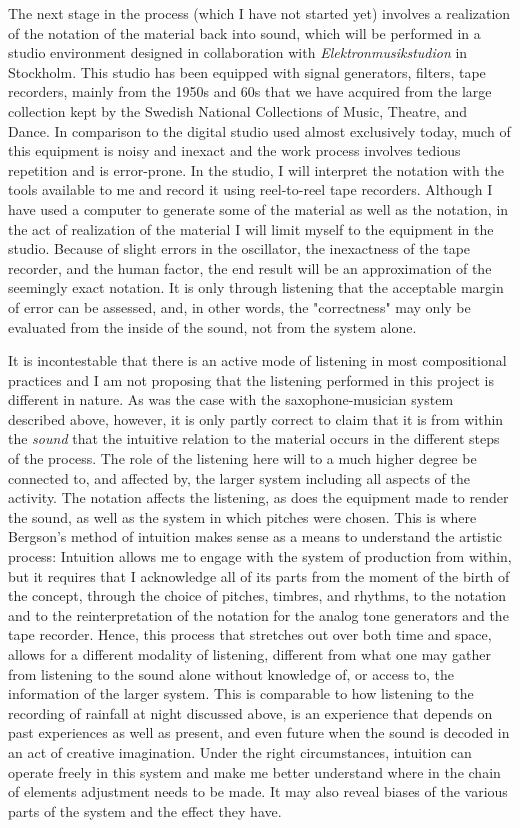 \documentclass[11pt]{article}
\begin{document}
The next stage in the process (which I have not started yet) involves a realization of the notation of the material back into sound, which will be performed in a studio environment designed in collaboration with \emph{Elektronmusikstudion} in Stockholm.
This studio has been equipped with signal generators, filters, tape recorders, mainly from the 1950s and 60s that we have acquired from the large collection kept by the Swedish National Collections of Music, Theatre, and Dance.
In comparison to the digital studio used almost exclusively today, much of this equipment is noisy and inexact and the work process involves tedious repetition and is error-prone.
In the studio, I will interpret the notation with the tools available to me and record it using reel-to-reel tape recorders.
Although I have used a computer to generate some of the material as well as the notation, in the act of realization of the material I will limit myself to the equipment in the studio. 
Because of slight errors in the oscillator, the inexactness of the tape recorder, and the human factor, the end result will be an approximation of the seemingly exact notation.
It is only through listening that the acceptable margin of error can be assessed, and, in other words, the "correctness" may only be evaluated from the inside of the sound, not from the system alone.


It is incontestable that there is an active mode of listening in most compositional practices and I am not proposing that the listening performed in this project is different in nature.
As was the case with the saxophone-musician system described above, however, it is only partly correct to claim that it is from within the \emph{sound} that the intuitive relation to the material occurs in the different steps of the process.
The role of the listening here will to a much higher degree be connected to, and affected by, the larger system including all aspects of the activity.
The notation affects the listening, as does the equipment made to render the sound, as well as the system in which pitches were chosen.
This is where Bergson's method of intuition makes sense as a means to understand the artistic process:
Intuition allows me to engage with the system of production from within, but it requires that I acknowledge all of its parts from the moment of the birth of the concept, through the choice of pitches, timbres, and rhythms, to the notation and to the reinterpretation of the notation for the analog tone generators and the tape recorder.
Hence, this process that stretches out over both time and space, allows for a different modality of listening, different from what one may gather from listening to the sound alone without knowledge of, or access to, the information of the larger system.
This is comparable to how listening to the recording of rainfall at night discussed above, is an experience that depends on past experiences as well as present, and even future when the sound is decoded in an act of creative imagination.
Under the right circumstances, intuition can operate freely in this system and make me better understand where in the chain of elements adjustment needs to be made.
It may also reveal biases of the various parts of the system and the effect they have. 
\end{document}
